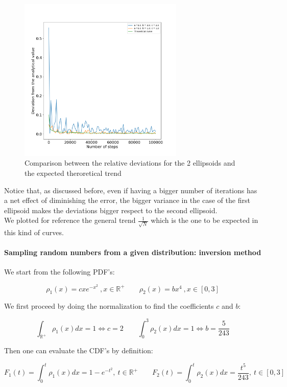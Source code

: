 \begin{figure}[h]
  \centering
  \includegraphics[width=0.7\textwidth]{FIG/exercise_0_images/relative_error_trend.png}
  \caption{Comparison between the relative deviations for the 2 ellipsoids and the expected theroretical trend}
  \label{lec1:deviation_comparison}
  \end{figure}


Notice that, as discussed before, even if having a bigger number of iterations has a net effect of diminishing the error, the bigger variance in 
the case of the first ellipsoid makes the deviations bigger respect to the second ellipsoid. \\
We plotted for reference the general trend $\frac{1}{\sqrt{N}}$ which is the one to be expected in this kind of curves.  


\paragraph{Sampling random numbers from a given distribution: inversion method}

We start from the following PDF's:

$$ \rho_1(x) = cxe^{-x^2}\ ,x \in \mathbb{R}^+ \qquad \rho_2(x) = bx^4\ , x \in [0,3]$$

We first proceed by doing the normalization to find the coefficients $c$ and $b$:

$$ \int_{\mathbb{R}^+}\rho_1(x)dx =1 \iff c=2 \qquad \int_{0}^3\rho_2(x)dx =1 \iff b = \frac{5}{243} $$

Then one can evaluate the CDF's by definition:

$$ F_1(t)=\int_{0}^t\rho_1(x)dx = 1-e^{-t^2}, \ t \in \mathbb{R}^+ \qquad F_2(t)=\int_{0}^t\rho_2(x)dx = \frac{t^5}{243}, \ t \in [0,3] $$

